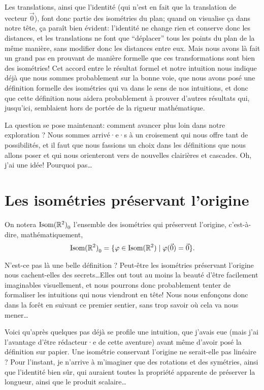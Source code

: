 \documentclass{book}
\numberwithin{equation}{section}
\renewcommand{\phi}{\varphi}
\providecommand{\plan}{{\mathbb R^2}}
\providecommand{\origin}{{\vec 0}}
\providecommand{\isom}{{\textnormal{Isom}(\plan)}}
\providecommand{\isomo}{{\isom_0}}
\providecommand{\tq}{\mid}
\begin{document}
Les translations, ainsi que l'identité (qui n'est en fait que la translation de vecteur $\origin$), font donc partie des isométries du plan; quand on visualise ça dans notre tête, ça paraît bien évident: l'identité ne change rien et conserve donc les distances, et les translations ne font que ``déplacer'' tous les points du plan de la même manière, sans modifier donc les distances entre eux. Mais nous avons là fait un grand pas en prouvant de manière formelle que ces transformations sont bien des isométries! Cet accord entre le résultat formel et notre intuition nous indique déjà que nous sommes probablement sur la bonne voie, que nous avons posé une définition formelle des isométries qui va dans le sens de nos intuitions, et donc que cette définition nous aidera probablement à prouver d'autres résultats qui, jusqu'ici, semblaient hors de portée de la rigueur mathématique.\par
La question se pose maintenant: comment avancer plus loin dans notre exploration ? Nous sommes arrivé·e·s à un croisement qui nous offre tant de possibilités, et il faut que nous fassions un choix dans les définitions que nous allons poser et qui nous orienteront vers de nouvelles clairières et cascades. Oh, j'ai une idée! Pourquoi pas\dots

\section{Les isométries préservant l'origine}

\begin{defn}
	On notera $\isomo$ l'ensemble des isométries qui préservent l'origine, c'est-à-dire, mathématiquement,
	\begin{equation*}
		\isomo = \{\phi \in \isom \tq \phi(\origin) = \origin\}.
	\end{equation*}
\end{defn}

N'est-ce pas là une belle définition ? Peut-être les isométries préservant l'origine nous cachent-elles des secrets\dots Elles ont tout au moins la beauté d'être facilement imaginables visuellement, et nous pourrons donc probablement tenter de formaliser les intuitions qui nous viendront en tête! Nous nous enfonçons donc dans la forêt en suivant ce premier sentier, sans trop savoir où cela va nous mener\dots\par

Voici qu'après quelques pas déjà se profile une intuition, que j'avais eue (mais j'ai l'avantage d'être rédacteur·e de cette aventure) avant même d'avoir posé la définition sur papier. Une isométrie conservant l'origine ne serait-elle pas linéaire ? Pour l'instant, je n'arrive à m'imaginer que des rotations et des symétries, ainsi que l'identité bien sûr, qui auraient toutes la propriété apparente de préserver la longueur, ainsi que le produit scalaire\dots
\end{document}
